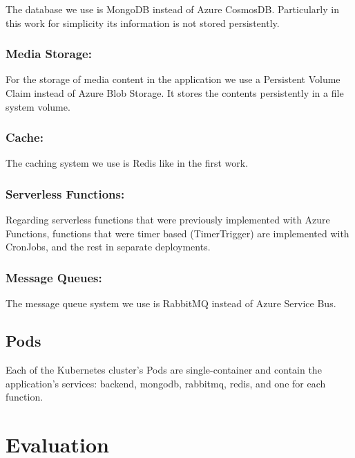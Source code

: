 \documentclass[runningheads]{llncs}
\begin{document}
The database we use is MongoDB instead of Azure CosmosDB. Particularly in this work for simplicity its information is not stored persistently.

\subsubsection{Media Storage:}

For the storage of media content in the application we use a Persistent Volume Claim instead of Azure Blob Storage. It stores the contents persistently in a file system volume.

\subsubsection{Cache:}

The caching system we use is Redis like in the first work.

\subsubsection{Serverless Functions:}

Regarding serverless functions that were previously implemented with Azure Functions, functions that were timer based (TimerTrigger) are implemented with CronJobs, and the rest in separate deployments.

\subsubsection{Message Queues:}

The message queue system we use is RabbitMQ instead of Azure Service Bus.

\subsection{Pods}

Each of the Kubernetes cluster's Pods are single-container and contain the application's services: backend, mongodb, rabbitmq, redis, and one for each function.

\section{Evaluation}
\end{document}
